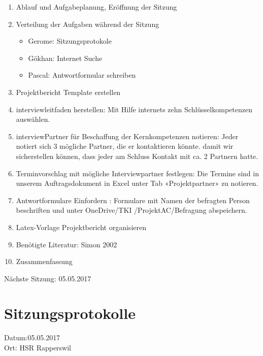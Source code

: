\begin{enumerate}

\item Ablauf und Aufgabeplanung, Eröffnung der Sitzung 

\item  Verteilung der Aufgaben während der Sitzung
\begin{itemize}
\item Gerome: Sitzungsprotokole
\item Gökhan: Internet Suche
\item Pascal: Antwortformular schreiben
\end{itemize}

\item	Projektbericht Template erstellen

\item  interviewleitfaden herstellen:  Mit Hilfe internets zehn Schlüsselkompetenzen auswählen.

\item 	interviewPartner für Beschaffung der Kernkompetenzen notieren: Jeder notiert sich 3 mögliche Partner, die er kontaktieren könnte. damit wir   sicherstellen können, dass jeder am Schluss Kontakt mit ca. 2 Partnern hatte.

\item 	Terminvorschlag mit mögliche Interviewpartner festlegen:  Die Termine sind in unserem Auftragsdokument in Excel unter Tab «Projektpartner» zu notieren.

\item	Antwortformulare Einfordern : Formulare mit Namen der befragten Person beschriften und unter OneDrive/TKI /ProjektAC/Befragung abspeichern.


\item Latex-Vorlage Projektbericht organisieren

\item Benötigte Literatur: Simon 2002   \cite{simon2002entwicklung}

\item Zusammenfassung

\end{enumerate}

Nächste Sitzung: 05.05.2017

\newpage
\section*{Sitzungsprotokolle}

Datum:05.05.2017\\
Ort: HSR Rapperswil

